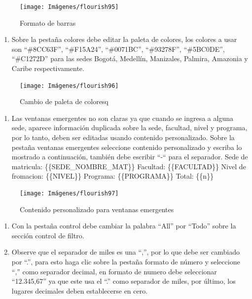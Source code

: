 \documentclass[
]{book}
\providecommand{\tightlist}{%
  \setlength{\itemsep}{0pt}\setlength{\parskip}{0pt}}
\begin{document}
\begin{figure}

{\centering \texttt{[image: Imágenes/flourish95]} 

}

\caption{Formato de barras}\label{fig:paso4jerarquiaflourish-fig}
\end{figure}

\begin{enumerate}
\def\labelenumi{\arabic{enumi}.}
\setcounter{enumi}{4}
\tightlist
\item
  Sobre la pestaña colores debe editar la paleta de colores, los colores a usar son ``\#8CC63F'', ``\#F15A24'', ``\#0071BC'', ``\#93278F'', ``\#5BC0DE'', ``\#C1272D'' para las sedes Bogotá, Medellín, Manizales, Palmira, Amazonia y Caribe respectivamente.
\end{enumerate}

\begin{figure}

{\centering \texttt{[image: Imágenes/flourish96]} 

}

\caption{Cambio de paleta de coloresq}\label{fig:paso5jerarquiaflourish-fig}
\end{figure}

\begin{enumerate}
\def\labelenumi{\arabic{enumi}.}
\setcounter{enumi}{5}
\tightlist
\item
  Las ventanas emergentes no son claras ya que cuando se ingresa a alguna sede, aparece información duplicada sobre la sede, facultad, nivel y programa, por lo tanto, deben ser editadas usando contenido personalizado. Sobre la pestaña ventanas emergentes seleccione contenido personalizado y escriba lo mostrado a continuación, también debe escribir ``-`` para el separador.
  Sede de matricula: \{\{SEDE\_NOMBRE\_MAT\}\}
  Facultad: \{\{FACULTAD\}\}
  Nivel de fromacion: \{\{NIVEL\}\}
  Programa: \{\{PROGRAMA\}\}
  Total: \{\{n\}\}
\end{enumerate}

\begin{figure}

{\centering \texttt{[image: Imágenes/flourish97]} 

}

\caption{Contenido personalizado para ventanas emergentes}\label{fig:paso6jerarquiaflourish-fig}
\end{figure}

\begin{enumerate}
\def\labelenumi{\arabic{enumi}.}
\setcounter{enumi}{6}
\item
  Con la pestaña control debe cambiar la palabra ``All'' por ``Todo'' sobre la sección control de filtro.
\item
  Observe que el separador de miles es una ``,'', por lo que debe ser cambiado por ``.'', para esto haga clic sobre la pestaña formato de número y seleccione ``,'' como separador decimal, en formato de numero debe seleccionar ``12.345,67'' ya que este usa el ``.'' como separador de miles, por último, los lugares decimales deben establecerse en cero.
\end{enumerate}
\end{document}
